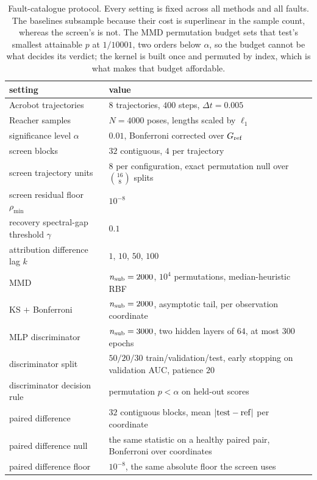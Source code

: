 \documentclass{article}
\begin{document}
\begin{table}[t]
\caption{Fault-catalogue protocol. Every setting is fixed across all methods and
all faults. The baselines subsample because their cost is superlinear in the
sample count, whereas the screen's is not. The MMD permutation budget sets that
test's smallest attainable $p$ at $1/10001$, two orders below $\alpha$, so the
budget cannot be what decides its verdict; the kernel is built once and permuted
by index, which is what makes that budget affordable.}
\label{tab:e1protocol}
\begin{center}
\small
\begin{tabular}{ll}
setting & value \\
\hline
Acrobot trajectories & $8$ trajectories, $400$ steps, $\Delta t = 0.005$ \\
Reacher samples & $N = 4000$ poses, lengths scaled by $\ell_1$ \\
significance level $\alpha$ & $0.01$, Bonferroni corrected over $G_{\rm ref}$ \\
screen blocks & $32$ contiguous, $4$ per trajectory \\
screen trajectory units & $8$ per configuration, exact permutation null over
  $\binom{16}{8}$ splits \\
screen residual floor $\rho_{\min}$ & $10^{-8}$ \\
recovery spectral-gap threshold $\gamma$ & $0.1$ \\
attribution difference lag $k$ & $1$, $10$, $50$, $100$ \\
MMD & $n_{\rm sub} = 2000$, $10^4$ permutations, median-heuristic RBF \\
KS $+$ Bonferroni & $n_{\rm sub} = 2000$, asymptotic tail, per observation
  coordinate \\
MLP discriminator & $n_{\rm sub} = 3000$, two hidden layers of $64$, at most
  $300$ epochs \\
discriminator split & $50/20/30$ train/validation/test, early stopping on
  validation AUC, patience $20$ \\
discriminator decision rule & permutation $p < \alpha$ on held-out scores \\
paired difference & $32$ contiguous blocks, mean $|{\rm test} - {\rm ref}|$ per
  coordinate \\
paired difference null & the same statistic on a healthy paired pair,
  Bonferroni over coordinates \\
paired difference floor & $10^{-8}$, the same absolute floor the screen uses \\
\end{tabular}
\end{center}
\end{table}
\end{document}
